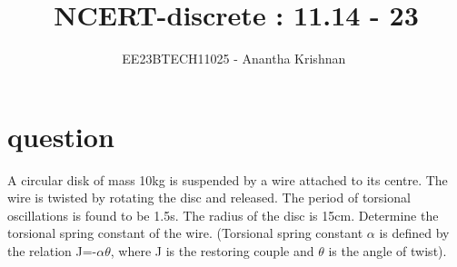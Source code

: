 \documentclass[journal,12pt,onecolumn]{IEEEtran}
\theoremstyle{remark}
\begin{document}

\vspace{3cm}

\title{NCERT-discrete : 11.14 - 23}
\author{EE23BTECH11025 - Anantha Krishnan $^{}$%
}
\maketitle
\bigskip

\renewcommand{\thefigure}{\theenumi}
\renewcommand{\thetable}{\theenumi}

\section{question}
A circular disk of mass 10kg is suspended by a wire attached to its centre. The wire is twisted by rotating the disc and released. The period of torsional oscillations is found to be 1.5s. The radius of the disc is 15cm. Determine the torsional spring constant of the wire. (Torsional spring constant $\alpha$ is defined by the relation J=-$\alpha$$\theta$, where J is the restoring couple and $\theta$ is the angle of twist).\\
\end{document}
